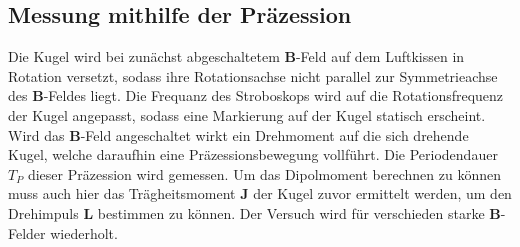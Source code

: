 \subsection{Messung mithilfe der Präzession}
Die Kugel wird bei zunächst abgeschaltetem $\symbf{B}$-Feld auf dem Luftkissen in Rotation versetzt, sodass ihre Rotationsachse nicht parallel zur Symmetrieachse des $\symbf{B}$-Feldes liegt.
Die Frequanz des Stroboskops wird auf die Rotationsfrequenz der Kugel angepasst, sodass eine Markierung auf der Kugel statisch erscheint.
Wird das $\symbf{B}$-Feld angeschaltet wirkt ein Drehmoment auf die sich drehende Kugel, welche daraufhin eine Präzessionsbewegung vollführt.
Die Periodendauer $T_P$ dieser Präzession wird gemessen.
Um das Dipolmoment berechnen zu können muss auch hier das Trägheitsmoment $\symbf{J}$ der Kugel zuvor ermittelt werden, 
um den Drehimpuls $\symbf{L}$ bestimmen zu können.
Der Versuch wird für verschieden starke $\symbf{B}$-Felder wiederholt.
